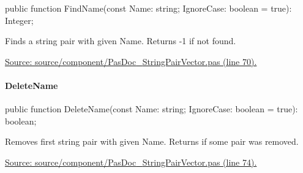 \documentclass{report}
\newif\ifpdf
\begin{document}
\label{PasDoc_StringPairVector.TStringPairVector-FindName}
\begin{list}{}{
\setlength{\itemindent}{0cm}
\setlength{\listparindent}{0cm}
\setlength{\leftmargin}{\evensidemargin}
\addtolength{\leftmargin}{\tmplength}
\settowidth{\labelsep}{X}
\addtolength{\leftmargin}{\labelsep}
\setlength{\labelwidth}{\tmplength}
}
\item[\textbf{Declaration}\hfill]
\ifpdf
\begin{flushleft}
\fi
\begin{ttfamily}
public function FindName(const Name: string; IgnoreCase: boolean = true): Integer;\end{ttfamily}

\ifpdf
\end{flushleft}
\fi

\par
\item[\textbf{Description}]
Finds a string pair with given Name. Returns {-}1 if not found.\par
\href{https://github.com/pasdoc/pasdoc/blob/master/source/component/PasDoc_StringPairVector.pas#L70}{Source: source/component/PasDoc{\_}StringPairVector.pas (line 70).}

\end{list}
\paragraph*{DeleteName}\hspace*{\fill}

\label{PasDoc_StringPairVector.TStringPairVector-DeleteName}
\begin{list}{}{
\setlength{\itemindent}{0cm}
\setlength{\listparindent}{0cm}
\setlength{\leftmargin}{\evensidemargin}
\addtolength{\leftmargin}{\tmplength}
\settowidth{\labelsep}{X}
\addtolength{\leftmargin}{\labelsep}
\setlength{\labelwidth}{\tmplength}
}
\item[\textbf{Declaration}\hfill]
\ifpdf
\begin{flushleft}
\fi
\begin{ttfamily}
public function DeleteName(const Name: string; IgnoreCase: boolean = true): boolean;\end{ttfamily}

\ifpdf
\end{flushleft}
\fi

\par
\item[\textbf{Description}]
Removes first string pair with given Name. Returns if some pair was removed.\par
\href{https://github.com/pasdoc/pasdoc/blob/master/source/component/PasDoc_StringPairVector.pas#L74}{Source: source/component/PasDoc{\_}StringPairVector.pas (line 74).}

\end{list}
\end{document}

